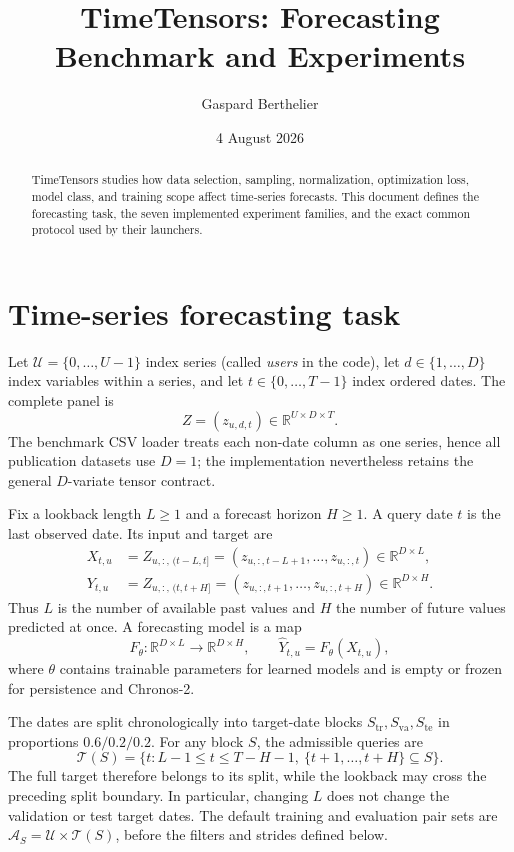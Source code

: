 \documentclass[10pt]{article}
\title{\vspace{-1.5em}\textbf{TimeTensors: Forecasting Benchmark and Experiments}\vspace{-0.4em}}
\author{Gaspard Berthelier}
\date{4 August 2026}
\newcommand{\reals}{\mathbb{R}}
\begin{document}
\maketitle
\thispagestyle{empty}

\begin{abstract}
TimeTensors studies how data selection, sampling, normalization, optimization
loss, model class, and training scope affect time-series forecasts. This
document defines the forecasting task, the seven implemented experiment
families, and the exact common protocol used by their launchers.
\end{abstract}

\tableofcontents

\section{Time-series forecasting task}
\label{sec:task}

Let $\mathcal U=\{0,\ldots,U-1\}$ index series (called \emph{users} in the
code), let $d\in\{1,\ldots,D\}$ index variables within a series, and let
$t\in\{0,\ldots,T-1\}$ index ordered dates. The complete panel is
\[
  Z=(z_{u,d,t})\in\reals^{U\times D\times T}.
\]
The benchmark CSV loader treats each non-date column as one series, hence all
publication datasets use $D=1$; the implementation nevertheless retains the
general $D$-variate tensor contract.

Fix a lookback length $L\geq1$ and a forecast horizon $H\geq1$. A query date
$t$ is the last observed date. Its input and target are
\begin{align}
  X_{t,u}
  &=Z_{u,:,\,(t-L,t]}
    =(z_{u,:,t-L+1},\ldots,z_{u,:,t})\in\reals^{D\times L},\\
  Y_{t,u}
  &=Z_{u,:,\,(t,t+H]}
    =(z_{u,:,t+1},\ldots,z_{u,:,t+H})\in\reals^{D\times H}.
\end{align}
Thus $L$ is the number of available past values and $H$ the number of future
values predicted at once. A forecasting model is a map
\[
  F_\theta:\reals^{D\times L}\longrightarrow\reals^{D\times H},
  \qquad \widehat Y_{t,u}=F_\theta(X_{t,u}),
\]
where $\theta$ contains trainable parameters for learned models and is empty or
frozen for persistence and Chronos-2.

The dates are split chronologically into target-date blocks
$S_{\mathrm{tr}},S_{\mathrm{va}},S_{\mathrm{te}}$ in proportions
$0.6/0.2/0.2$. For any block $S$, the admissible queries are
\[
  \mathcal T(S)=\{t:L-1\leq t\leq T-H-1,
  \ \{t+1,\ldots,t+H\}\subseteq S\}.
\]
The full target therefore belongs to its split, while the lookback may cross
the preceding split boundary. In particular, changing $L$ does not change the
validation or test target dates. The default training and evaluation pair sets
are $\mathcal A_S=\mathcal U\times\mathcal T(S)$, before the filters and strides
defined below.
\end{document}
